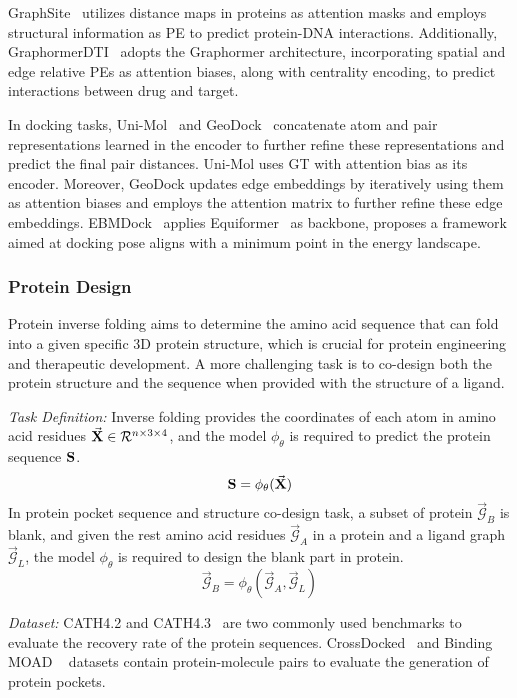 GraphSite~\cite{yuan2022alphafold2} utilizes distance maps in proteins as attention masks and employs structural information as PE to predict protein-DNA interactions. Additionally, GraphormerDTI~\cite{gao2024graphormerdti} adopts the Graphormer architecture, incorporating spatial and edge relative PEs as attention biases, along with centrality encoding, to predict interactions between drug and target.

In docking tasks, Uni-Mol~\cite{zhou2023unimol} and GeoDock~\cite{chu2024flexible} concatenate atom and pair representations learned in the encoder to further refine these representations and predict the final pair distances. Uni-Mol uses GT with attention bias as its encoder. Moreover, GeoDock updates edge embeddings by iteratively using them as attention biases and employs the attention matrix to further refine these edge embeddings. EBMDock~\cite{wu2024ebmdock} applies Equiformer~\cite{liao2023equiformer} as backbone, proposes a framework aimed at docking pose aligns with a minimum point in the energy landscape.


\subsubsection{\textbf{Protein Design}}
Protein inverse folding aims to determine the amino acid sequence that can fold into a given specific 3D protein structure, which is crucial for protein engineering and therapeutic development. A more challenging task is to co-design both the protein structure and the sequence when provided with the structure of a ligand.

\textit{Task Definition:}
Inverse folding provides the coordinates of each atom in amino acid residues $\vec{\mathbf{X}} \in \mathcal{R}^{n \times 3 \times 4}$, and the model $\phi_\theta$ is required to predict the protein sequence $\mathbf{S}$.
\begin{equation}
    \mathbf{S} = \phi_\theta(\vec{\mathbf{X}})
\end{equation}
In protein pocket sequence and structure co-design task, a subset of protein $\vec{\mathcal{G}}_B$ is blank, and given the rest amino acid residues $\vec{\mathcal{G}}_A$ in a protein and a ligand graph $\vec{\mathcal{G}}_L$, the model $\phi_\theta$ is required to design the blank part in protein.
\begin{equation}
    \vec{\mathcal{G}}_B = \phi_\theta(\vec{\mathcal{G}}_A, \vec{\mathcal{G}}_L)
\end{equation}

\textit{Dataset:}
CATH4.2 and CATH4.3~\cite{orengo1997cath} are two commonly used benchmarks to evaluate the recovery rate of the protein sequences.
CrossDocked~\cite{francoeur2020three} and Binding MOAD ~\cite{hu2005binding} datasets contain protein-molecule pairs to evaluate the generation of protein pockets.


